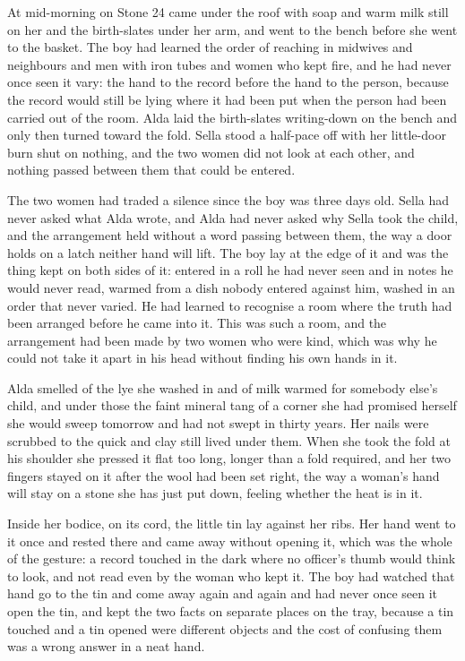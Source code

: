 \scenebreak


At mid-morning on Stone 24  came under the roof with soap and warm milk still on her and the birth-slates under her arm, and went to the bench before she went to the basket. The boy had learned the order of reaching in midwives and neighbours and men with iron tubes and women who kept fire, and he had never once seen it vary: the hand to the record before the hand to the person, because the record would still be lying where it had been put when the person had been carried out of the room. Alda laid the birth-slates writing-down on the bench and only then turned toward the fold. Sella stood a half-pace off with her little-door burn shut on nothing, and the two women did not look at each other, and nothing passed between them that could be entered.

The two women had traded a silence since the boy was three days old. Sella had never asked what Alda wrote, and Alda had never asked why Sella took the child, and the arrangement held without a word passing between them, the way a door holds on a latch neither hand will lift. The boy lay at the edge of it and was the thing kept on both sides of it: entered in a roll he had never seen and in notes he would never read, warmed from a dish nobody entered against him, washed in an order that never varied. He had learned to recognise a room where the truth had been arranged before he came into it. This was such a room, and the arrangement had been made by two women who were kind, which was why he could not take it apart in his head without finding his own hands in it.

Alda smelled of the lye she washed in and of milk warmed for somebody else's child, and under those the faint mineral tang of a corner she had promised herself she would sweep tomorrow and had not swept in thirty years. Her nails were scrubbed to the quick and clay still lived under them. When she took the fold at his shoulder she pressed it flat too long, longer than a fold required, and her two fingers stayed on it after the wool had been set right, the way a woman's hand will stay on a stone she has just put down, feeling whether the heat is in it.

Inside her bodice, on its cord, the little tin lay against her ribs. Her hand went to it once and rested there and came away without opening it, which was the whole of the gesture: a record touched in the dark where no officer's thumb would think to look, and not read even by the woman who kept it. The boy had watched that hand go to the tin and come away again and again and had never once seen it open the tin, and kept the two facts on separate places on the tray, because a tin touched and a tin opened were different objects and the cost of confusing them was a wrong answer in a neat hand.

